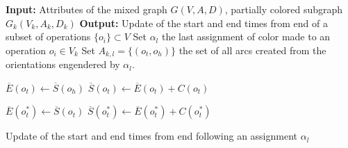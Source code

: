 \begin{algorithm}[htb]		
	\textbf{Input:} Attributes of the mixed graph $G(V,A,D)$, partially colored subgraph $G_k(V_k,A_k,D_k)$\;
	\textbf{Output:} Update of the start and end times from end of a subset of operations $\{o_i\} \subset V$\;
	Set $\alpha_l$ the last assignment of color made to an operation $o_i \in V_k$\;
	Set $A_{k,l} = \{(o_t,o_h)\}$ the set of all arcs created from the orientations engendered by $\alpha_l$.
		{
				{
						{
							$\overline{E}(o_t) \leftarrow \overline{S}(o_h)$\;
							$\overline{S}(o_t) \leftarrow \overline{E}(o_t) + C(o_t)$\;
							\;
						}
					
				}
		}
		{
			{
						{
							{
								$\overline{E}(o_t^*) \leftarrow \overline{S}(o_t)$\;
								$\overline{S}(o_t^*) \leftarrow \overline{E}(o_t^*) + C(o_t^*)$\;
								\;
							}
						}
			}
			 \KwRet\;
		}
	\caption{Update of the start and end times from end following an assignment $\alpha_l$}
	\label{algo:update_e}
\end{algorithm}

